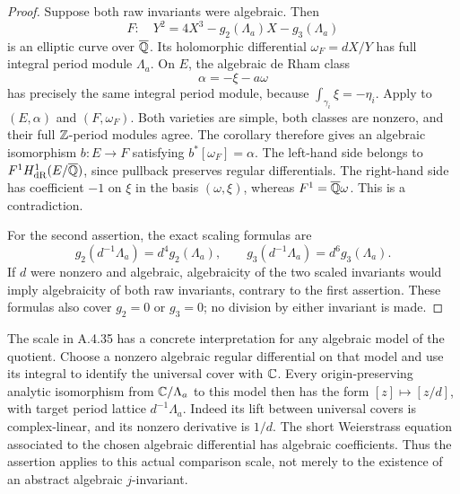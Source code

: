 \begin{proof}
Suppose both raw invariants were algebraic. Then
\[
 F:\quad Y^2=4X^3-g_2(\Lambda_a)X-g_3(\Lambda_a)
\]
is an elliptic curve over $\overline{\mathbb Q}$. Its holomorphic differential
$\omega_F=dX/Y$ has full integral period module $\Lambda_a$.
On $E$, the algebraic de Rham class
\[
 \alpha=-\xi-a\omega
\]
has precisely the same integral period module, because
$\int_{\gamma_i}\xi=-\eta_i$.
Apply \cite[Corollary 2, p.14 of the opened version]{EllMovasati2008}
to $(E,\alpha)$ and $(F,\omega_F)$.
Both varieties are simple, both classes are nonzero, and their full
$\mathbb Z$-period modules agree. The corollary therefore gives an algebraic
isomorphism $b:E\longrightarrow F$ satisfying
$b^*[\omega_F]=\alpha$.
The left-hand side belongs to $F^1H^1_{\mathrm{dR}}(E/\overline{\mathbb Q})$,
since pullback preserves regular differentials. The right-hand
side has coefficient $-1$ on $\xi$ in the basis $(\omega,\xi)$,
whereas $F^1=\overline{\mathbb Q}\omega$. This is a contradiction.

For the second assertion, the exact scaling formulas are
\[
 g_2(d^{-1}\Lambda_a)=d^4g_2(\Lambda_a),\qquad
 g_3(d^{-1}\Lambda_a)=d^6g_3(\Lambda_a).
\]
If $d$ were nonzero and algebraic, algebraicity of the two scaled
invariants would imply algebraicity of both raw invariants, contrary
to the first assertion. These formulas also cover $g_2=0$ or $g_3=0$;
no division by either invariant is made.
\end{proof}

The scale in A.4.35 has a concrete interpretation for any algebraic
model of the quotient. Choose a nonzero algebraic regular differential
on that model and use its integral to identify the universal cover
with $\mathbb C$. Every origin-preserving analytic isomorphism from
$\mathbb C/\Lambda_a$ to this model then has the form
$[z]\mapsto[z/d]$, with target period lattice $d^{-1}\Lambda_a$.
Indeed its lift between universal covers is complex-linear, and its
nonzero derivative is $1/d$. The short Weierstrass equation associated
to the chosen algebraic differential has algebraic coefficients.
Thus the assertion applies to this actual comparison scale, not
merely to the existence of an abstract algebraic $j$-invariant.

